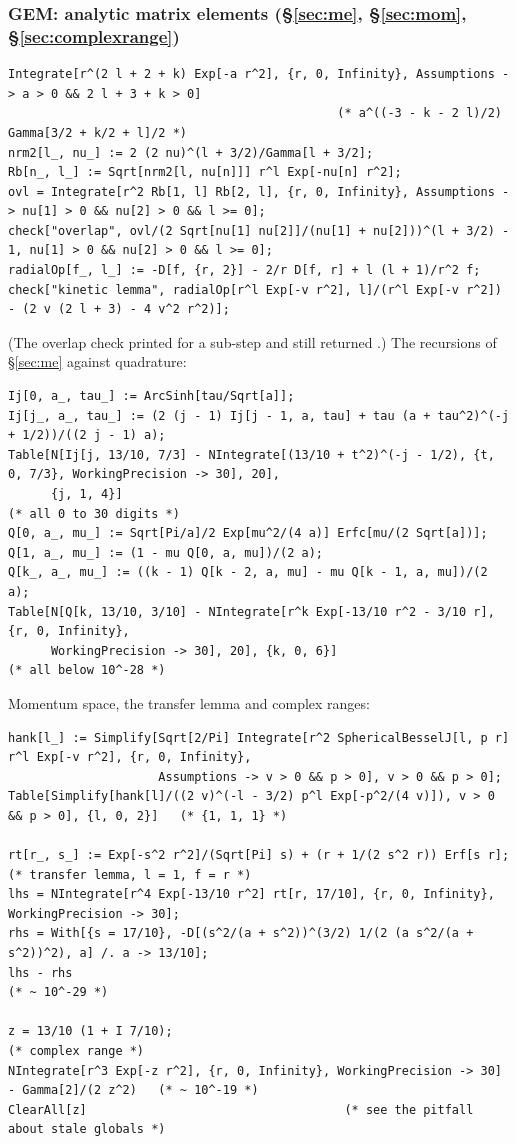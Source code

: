 \documentclass[11pt,a4paper]{article}
\numberwithin{equation}{section}
\theoremstyle{definition}
\theoremstyle{plain}
\theoremstyle{remark}
\numberwithin{algorithm}{section}
\begin{document}
\subsubsection{GEM: analytic matrix elements (\S\ref{sec:me}, \S\ref{sec:mom}, \S\ref{sec:complexrange})}
\begin{lstlisting}[style=wl]
Integrate[r^(2 l + 2 + k) Exp[-a r^2], {r, 0, Infinity}, Assumptions -> a > 0 && 2 l + 3 + k > 0]
                                              (* a^((-3 - k - 2 l)/2) Gamma[3/2 + k/2 + l]/2 *)
nrm2[l_, nu_] := 2 (2 nu)^(l + 3/2)/Gamma[l + 3/2];
Rb[n_, l_] := Sqrt[nrm2[l, nu[n]]] r^l Exp[-nu[n] r^2];
ovl = Integrate[r^2 Rb[1, l] Rb[2, l], {r, 0, Infinity}, Assumptions -> nu[1] > 0 && nu[2] > 0 && l >= 0];
check["overlap", ovl/(2 Sqrt[nu[1] nu[2]]/(nu[1] + nu[2]))^(l + 3/2) - 1, nu[1] > 0 && nu[2] > 0 && l >= 0];
radialOp[f_, l_] := -D[f, {r, 2}] - 2/r D[f, r] + l (l + 1)/r^2 f;
check["kinetic lemma", radialOp[r^l Exp[-v r^2], l]/(r^l Exp[-v r^2]) - (2 v (2 l + 3) - 4 v^2 r^2)];
\end{lstlisting}
(The overlap check printed  for a sub-step and still returned .) The recursions of \S\ref{sec:me} against quadrature:
\begin{lstlisting}[style=wl]
Ij[0, a_, tau_] := ArcSinh[tau/Sqrt[a]];
Ij[j_, a_, tau_] := (2 (j - 1) Ij[j - 1, a, tau] + tau (a + tau^2)^(-j + 1/2))/((2 j - 1) a);
Table[N[Ij[j, 13/10, 7/3] - NIntegrate[(13/10 + t^2)^(-j - 1/2), {t, 0, 7/3}, WorkingPrecision -> 30], 20],
      {j, 1, 4}]                                                         (* all 0 to 30 digits *)
Q[0, a_, mu_] := Sqrt[Pi/a]/2 Exp[mu^2/(4 a)] Erfc[mu/(2 Sqrt[a])];
Q[1, a_, mu_] := (1 - mu Q[0, a, mu])/(2 a);
Q[k_, a_, mu_] := ((k - 1) Q[k - 2, a, mu] - mu Q[k - 1, a, mu])/(2 a);
Table[N[Q[k, 13/10, 3/10] - NIntegrate[r^k Exp[-13/10 r^2 - 3/10 r], {r, 0, Infinity},
      WorkingPrecision -> 30], 20], {k, 0, 6}]                           (* all below 10^-28 *)
\end{lstlisting}
Momentum space, the transfer lemma and complex ranges:
\begin{lstlisting}[style=wl]
hank[l_] := Simplify[Sqrt[2/Pi] Integrate[r^2 SphericalBesselJ[l, p r] r^l Exp[-v r^2], {r, 0, Infinity},
                     Assumptions -> v > 0 && p > 0], v > 0 && p > 0];
Table[Simplify[hank[l]/((2 v)^(-l - 3/2) p^l Exp[-p^2/(4 v)]), v > 0 && p > 0], {l, 0, 2}]   (* {1, 1, 1} *)

rt[r_, s_] := Exp[-s^2 r^2]/(Sqrt[Pi] s) + (r + 1/(2 s^2 r)) Erf[s r];   (* transfer lemma, l = 1, f = r *)
lhs = NIntegrate[r^4 Exp[-13/10 r^2] rt[r, 17/10], {r, 0, Infinity}, WorkingPrecision -> 30];
rhs = With[{s = 17/10}, -D[(s^2/(a + s^2))^(3/2) 1/(2 (a s^2/(a + s^2))^2), a] /. a -> 13/10];
lhs - rhs                                                                (* ~ 10^-29 *)

z = 13/10 (1 + I 7/10);                                                  (* complex range *)
NIntegrate[r^3 Exp[-z r^2], {r, 0, Infinity}, WorkingPrecision -> 30] - Gamma[2]/(2 z^2)   (* ~ 10^-19 *)
ClearAll[z]                                    (* see the pitfall about stale globals *)
\end{lstlisting}
\end{document}
